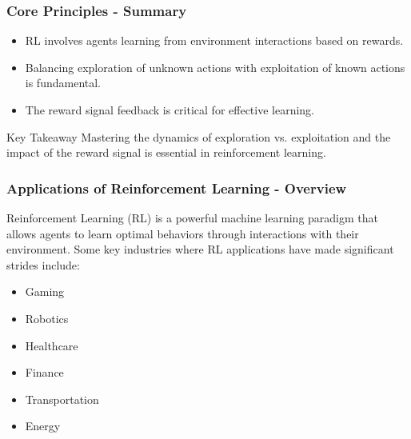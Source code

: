 \documentclass[aspectratio=169]{beamer}
\begin{document}
\begin{frame}[fragile]
    \frametitle{Core Principles - Summary}
    \begin{itemize}
        \item RL involves agents learning from environment interactions based on rewards.
        \item Balancing exploration of unknown actions with exploitation of known actions is fundamental.
        \item The reward signal feedback is critical for effective learning.
    \end{itemize}
    \begin{block}{Key Takeaway}
        Mastering the dynamics of exploration vs. exploitation and the impact of the reward signal is essential in reinforcement learning.
    \end{block}
\end{frame}

\begin{frame}[fragile]
    \frametitle{Applications of Reinforcement Learning - Overview}
    Reinforcement Learning (RL) is a powerful machine learning paradigm that allows agents to learn optimal behaviors through interactions with their environment. Some key industries where RL applications have made significant strides include:
    \begin{itemize}
        \item Gaming
        \item Robotics
        \item Healthcare
        \item Finance
        \item Transportation
        \item Energy
    \end{itemize}
\end{frame}
\end{document}
